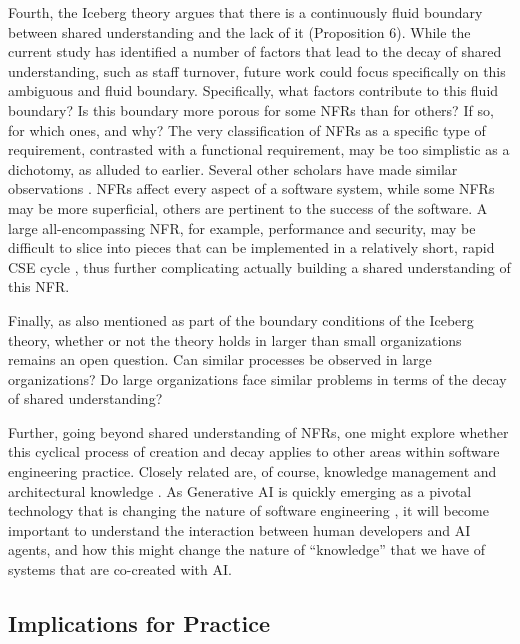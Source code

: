 \documentclass[smallextended]{svjour3}
\begin{document}
Fourth, the Iceberg theory argues that there is a continuously fluid boundary between shared understanding and the lack of it (Proposition 6). While the current study has identified a number of factors that lead to the decay of shared understanding, such as staff turnover, future work could focus specifically on this ambiguous and fluid boundary. Specifically, what factors contribute to this fluid boundary? Is this boundary more porous for some NFRs than for others? If so, for which ones, and why? The very classification of NFRs as a specific type of requirement, contrasted with a functional requirement, may be too simplistic as a dichotomy, as alluded to earlier. Several other scholars have made similar observations \citep{glinz_non-functional_2007,eckhardt2016non}.  
NFRs affect every aspect of a software system, while some NFRs may be more superficial, others are pertinent to the success of the software.
A large all-encompassing NFR, for example, performance and security, may be difficult to slice into pieces that can be implemented in a relatively short, rapid CSE cycle \citep{bellomo_evolutionary_2014}, thus further complicating actually building a shared understanding of this NFR.



Finally, as also mentioned as part of the boundary conditions of the Iceberg theory, whether or not the theory holds in larger than small organizations remains an open question. Can similar processes be observed in large organizations? Do large organizations face similar problems in terms of the decay of shared understanding?

Further, going beyond shared understanding of NFRs, one might explore whether this cyclical process of creation and decay applies to other areas within software engineering practice. Closely related are, of course, knowledge management \citep{bjornson2008knowledge} and architectural knowledge \citep{capilla2016}. As Generative AI is quickly emerging as a pivotal technology that is changing the nature of software engineering \citep{stray2025genai}, it will become important to understand the interaction between human developers and AI agents, and how this might change the nature of ``knowledge'' that we have of systems that are co-created with AI. 


\subsection{Implications for Practice}
\label{sec:practical}
\end{document}
